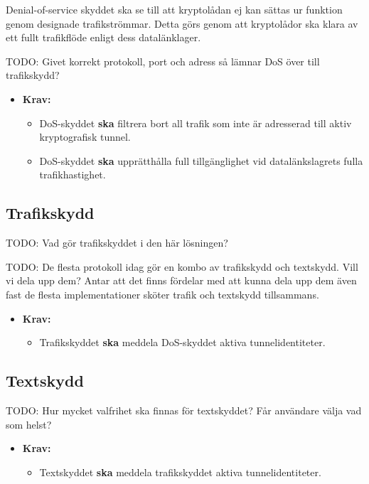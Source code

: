 \documentclass[12pt,a4paper]{article}
\providecommand{\tightlist}{%
  \setlength{\itemsep}{2pt}\setlength{\parskip}{0pt}\setlength{\partopsep}{2pt}\setlength{\topsep}{2pt}}
\begin{document}
Denial-of-service skyddet ska se till att kryptolådan ej kan sättas ur
funktion genom designade trafikströmmar. Detta görs genom att
kryptolådor ska klara av ett fullt trafikflöde enligt dess
datalänklager.

TODO: Givet korrekt protokoll, port och adress så lämnar DoS över till
trafikskydd?

\begin{itemize}
\tightlist
\item
  \textbf{Krav:}

  \begin{itemize}
  \tightlist
  \item
    DoS-skyddet \textbf{ska} filtrera bort all trafik som inte är
    adresserad till aktiv kryptografisk tunnel.
  \item
    DoS-skyddet \textbf{ska} upprätthålla full tillgänglighet vid
    datalänkslagrets fulla trafikhastighet.
  \end{itemize}
\end{itemize}

\subsection{Trafikskydd}\label{trafikskydd}

TODO: Vad gör trafikskyddet i den här lösningen?

TODO: De flesta protokoll idag gör en kombo av trafikskydd och
textskydd. Vill vi dela upp dem? Antar att det finns fördelar med att
kunna dela upp dem även fast de flesta implementationer sköter trafik
och textskydd tillsammans.

\begin{itemize}
\tightlist
\item
  \textbf{Krav:}

  \begin{itemize}
  \tightlist
  \item
    Trafikskyddet \textbf{ska} meddela DoS-skyddet aktiva
    tunnelidentiteter.
  \end{itemize}
\end{itemize}

\subsection{Textskydd}\label{textskydd}

TODO: Hur mycket valfrihet ska finnas för textskyddet? Får användare
välja vad som helst?

\begin{itemize}
\tightlist
\item
  \textbf{Krav:}

  \begin{itemize}
  \tightlist
  \item
    Textskyddet \textbf{ska} meddela trafikskyddet aktiva
    tunnelidentiteter.
  \end{itemize}
\end{itemize}
\end{document}
